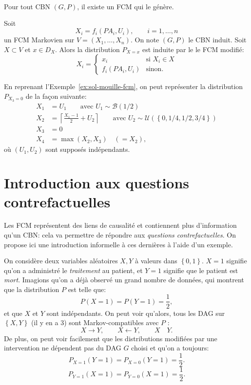 \begin{theorem}
\label{thm:exists-generating-fcm}
Pour tout CBN $(G,P)$, il existe un FCM qui le génère.
\end{theorem}



\begin{proposition}
  \label{prop:intervention-fcm}
  Soit \[ X_i=f_i(PA_i,U_i),\qquad i=1,\dots,n \] un FCM Markovien sur
  $V=(X_1,\dots,X_n)$. On note $(G,P)$ le CBN induit.  Soit
  $X\subset V$ et $x\in D_X$.  Alors la distribution $P_{X=x}$ est
  induite par le le FCM modifié:
  \[ X_i= \begin{cases} x_i&\text{si $X_i\in X$}\\
      f_i(PA_i,U_i)&\text{sinon}. \end{cases} \]
\end{proposition}
\begin{example}
 En reprenant l'Exemple~\ref{ex:sol-mouille-fcm}, on peut représenter
 la distribution $P_{X_3=0}$ de la façon suivante:
\begin{align*}
X_1&=U_1\qquad \text{avec }U_1\sim \mathcal{B}(1/2)\\
X_2&=\left\lceil \frac{X_1-1}{2}+U_2 \right\rceil \qquad \text{avec }U_2\sim \mathcal{U}(\left\{ 0,1/4,1/2,3/4 \right\})\\
X_3&=0\\
X_4&=\max_{}(X_2,X_3)\quad (=X_2),
\end{align*}
où $(U_1,U_2)$ sont supposés indépendants.
\end{example}


\section{Introduction aux questions contrefactuelles}
\label{sec:intr-aux-quest}

Les FCM représentent des liens de causalité et contiennent plus d'information qu'un CBN: cela va permettre
de répondre aux \emph{questions contrefactuelles}.
On propose ici une introduction informelle à ces dernières à l'aide d'un exemple.

On considère deux variables aléatoires $X,Y$ à valeurs dans $\left\{ 0,1 \right\}$.
$X=1$ signifie qu'on a administré le \emph{traitement} au patient, et
$Y=1$ signifie que le patient est \emph{mort}.
Imagions qu'on a déjà observé un grand nombre de données,
qui montrent que la distribution $P$ est telle que:
\[ P(X=1)=P(Y=1)=\frac{1}{2},  \]
et que $X$ et $Y$ sont indépendants.
On peut voir qu'alors, tous les DAG sur $\left\{ X,Y \right\}$ (il y
en a 3) sont
Markov-compatibles avec $P$ :
\[ X\to Y,\qquad X\leftarrow Y,\qquad X\quad Y. \]
De plus, on peut voir facilement que les distributions modifiées par une
intervention ne dépendent pas du DAG $G$ choisi et qu'on a toujours:
\[ P_{X=1}(Y=1)=P_{X=0}(Y=1)=\frac{1}{2}. \]
\[ P_{Y=1}(X=1)=P_{Y=0}(X=1)=\frac{1}{2}. \]

